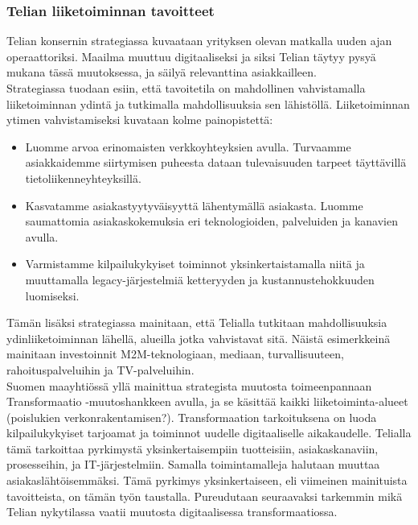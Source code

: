 \documentclass[finnish,12pt,a4paper,pdftex]{article}
\begin{document}
\subsubsection{Telian liiketoiminnan tavoitteet}

Telian konsernin strategiassa \citeyearpar{telia} kuvaataan yrityksen olevan matkalla uuden ajan operaattoriksi. Maailma muuttuu digitaaliseksi ja siksi Telian täytyy pysyä mukana tässä muutoksessa, ja säilyä relevanttina asiakkailleen.  \\

Strategiassa tuodaan esiin, että tavoitetila on mahdollinen vahvistamalla liiketoiminnan ydintä ja tutkimalla mahdollisuuksia sen lähistöllä. Liiketoiminnan ytimen vahvistamiseksi kuvataan kolme painopistettä:
\begin{itemize}
    \item Luomme arvoa erinomaisten verkkoyhteyksien avulla. Turvaamme asiakkaidemme siirtymisen puheesta dataan tulevaisuuden tarpeet täyttävillä tietoliikenneyhteyksillä.
    \item Kasvatamme asiakastyytyväisyyttä lähentymällä asiakasta. Luomme saumattomia asiakaskokemuksia eri teknologioiden, palveluiden ja kanavien avulla.
    \item Varmistamme kilpailukykyiset toiminnot yksinkertaistamalla niitä ja muuttamalla legacy-järjestelmiä ketteryyden ja kustannustehokkuuden luomiseksi.
\end{itemize}

Tämän lisäksi strategiassa mainitaan, että Telialla tutkitaan mahdollisuuksia ydinliiketoiminnan lähellä, alueilla jotka vahvistavat sitä. Näistä esimerkkeinä mainitaan investoinnit M2M-teknologiaan, mediaan, turvallisuuteen, rahoituspalveluihin ja TV-palveluihin.\\

Suomen maayhtiössä yllä mainittua strategista muutosta toimeenpannaan Transformaatio -muutoshankkeen avulla, ja se käsittää kaikki liiketoiminta-alueet (poislukien verkonrakentamisen?). Transformaation tarkoituksena on luoda kilpailukykyiset tarjoamat ja toiminnot uudelle digitaaliselle aikakaudelle. Telialla tämä tarkoittaa pyrkimystä yksinkertaisempiin tuotteisiin, asiakaskanaviin, prosesseihin, ja IT-järjestelmiin. Samalla toimintamalleja halutaan muuttaa asiakaslähtöisemmäksi. Tämä pyrkimys yksinkertaiseen, eli viimeinen mainituista tavoitteista, on tämän työn taustalla. Pureudutaan seuraavaksi tarkemmin mikä Telian nykytilassa vaatii muutosta digitaalisessa transformaatiossa.
\end{document}
